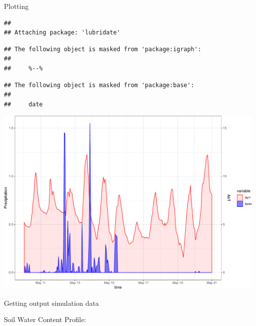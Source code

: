 \documentclass[ignorenonframetext,]{beamer}
\newenvironment{Shaded}{\begin{snugshade}}{\end{snugshade}}
\newcommand{\KeywordTok}[1]{\textcolor[rgb]{0.13,0.29,0.53}{\textbf{#1}}}
\newcommand{\DataTypeTok}[1]{\textcolor[rgb]{0.13,0.29,0.53}{#1}}
\newcommand{\StringTok}[1]{\textcolor[rgb]{0.31,0.60,0.02}{#1}}
\newcommand{\OtherTok}[1]{\textcolor[rgb]{0.56,0.35,0.01}{#1}}
\newcommand{\NormalTok}[1]{#1}
\begin{document}
\begin{frame}[fragile]{Plotting}

\begin{verbatim}
## 
## Attaching package: 'lubridate'
\end{verbatim}

\begin{verbatim}
## The following object is masked from 'package:igraph':
## 
##     %--%
\end{verbatim}

\begin{verbatim}
## The following object is masked from 'package:base':
## 
##     date
\end{verbatim}

\includegraphics{presentation_files/figure-beamer/unnamed-chunk-5-1.pdf}

\end{frame}

\begin{frame}[fragile]{Getting output simulation data}

Soil Water Content Profile:

\begin{Shaded}
\end{Shaded}

\end{frame}
\end{document}
